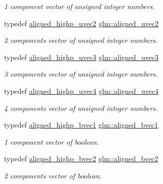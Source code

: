 \begin{DoxyCompactItemize}
\begin{DoxyCompactList}\small\item\em 1 component vector of unsigned integer numbers. \end{DoxyCompactList}\item 
typedef \mbox{\hyperlink{group__gtc__type__aligned_gadbe09d1af82957ec00a3baaa89120f1e}{aligned\+\_\+highp\+\_\+uvec2}} \mbox{\hyperlink{group__gtc__type__aligned_gacddd39189c2dedf7dd48c02155279124}{glm\+::aligned\+\_\+uvec2}}
\begin{DoxyCompactList}\small\item\em 2 components vector of unsigned integer numbers. \end{DoxyCompactList}\item 
typedef \mbox{\hyperlink{group__gtc__type__aligned_gac7b68f6ca0c6a536c9692bfb885a0006}{aligned\+\_\+highp\+\_\+uvec3}} \mbox{\hyperlink{group__gtc__type__aligned_ga5dee635ca69be0f5de5630a59d89034f}{glm\+::aligned\+\_\+uvec3}}
\begin{DoxyCompactList}\small\item\em 3 components vector of unsigned integer numbers. \end{DoxyCompactList}\item 
typedef \mbox{\hyperlink{group__gtc__type__aligned_ga15c8f3d51b9df35dbf8bf2276512588b}{aligned\+\_\+highp\+\_\+uvec4}} \mbox{\hyperlink{group__gtc__type__aligned_ga1e0792f3c64836e042ee3aad9bd8209c}{glm\+::aligned\+\_\+uvec4}}
\begin{DoxyCompactList}\small\item\em 4 components vector of unsigned integer numbers. \end{DoxyCompactList}\item 
typedef \mbox{\hyperlink{group__gtc__type__aligned_ga3e78791d8be2a1766bc7bc9d666f0f7f}{aligned\+\_\+highp\+\_\+bvec1}} \mbox{\hyperlink{group__gtc__type__aligned_ga7db5fd015b60682f3fdfe9cab47188dd}{glm\+::aligned\+\_\+bvec1}}
\begin{DoxyCompactList}\small\item\em 1 component vector of boolean. \end{DoxyCompactList}\item 
typedef \mbox{\hyperlink{group__gtc__type__aligned_ga0864e6acd440d07a7eff815da8990467}{aligned\+\_\+highp\+\_\+bvec2}} \mbox{\hyperlink{group__gtc__type__aligned_ga58579cb7fcfb892d0ae1f085327ae2ca}{glm\+::aligned\+\_\+bvec2}}
\begin{DoxyCompactList}\small\item\em 2 components vector of boolean. \end{DoxyCompactList}\item 

\end{DoxyCompactItemize}

